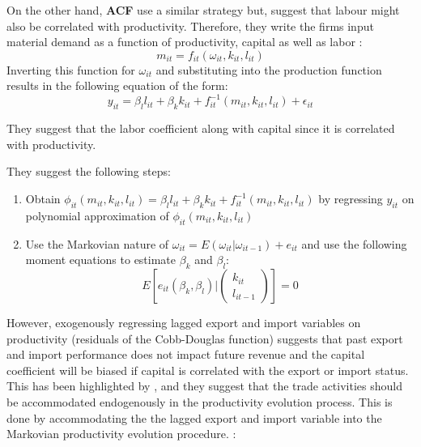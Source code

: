 \documentclass[12pt]{article}
\begin{document}
On the other hand, \textcite{ackerberg2006structural} \textbf{ACF} use a
similar strategy but, suggest that labour might also be
correlated with productivity. Therefore, they write  the firms input
material demand as a function of productivity, capital as well as
labor : 
$$ m_{it} = f_{it}(\omega_{it}, k_{it}, l_{it})$$
Inverting this function for $\omega_{it}$ and substituting into the
production function results in the following 
equation of the form:
\begin{equation}
y_{it} = \beta_{l}l_{it} + \beta_k k_{it} + f_{it}^{-1}(m_{it},
k_{it}, l_{it})+ \epsilon_{it}
\end{equation}


They suggest that the  labor coefficient along with capital since it is correlated with
productivity. 

They suggest the following steps:
\begin{enumerate}
\item Obtain $\phi_{it}(m_{it}, k_{it}, l_{it}) = \beta_{l}l_{it} + \beta_k k_{it} + f_{it}^{-1}(m_{it},
k_{it}, l_{it})$ by regressing $y_{it}$ on polynomial approximation of
$\phi_{it}(m_{it}, k_{it}, l_{it})$
\item Use the Markovian nature of $\omega_{it} =
  E(\omega_{it}|\omega_{it-1}) + e_{it}$
and use the following moment equations to estimate $\beta_{k}$ and
$\beta_{l}$:
\begin{equation}
E[e_{it}(\beta_{k},\beta_{l})|\begin{pmatrix}k_{it}\\ l_{it-1}
\end{pmatrix}
]= 0
\end{equation}
\end{enumerate} 


However, exogenously regressing lagged  export and import variables  on
productivity (residuals of the Cobb-Douglas function) suggests that past
export and import performance  does not impact future revenue and the
capital coefficient will be biased if capital is correlated with the
export or import status.  This has been highlighted by \textcite{de2013detecting}, and
they suggest that the trade activities should be accommodated
endogenously in the productivity evolution process. This is done by
accommodating the the lagged export and import variable into the
Markovian productivity evolution procedure. :
\end{document}
